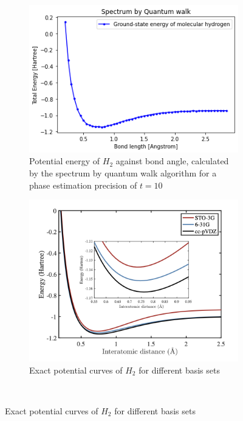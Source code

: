 \begin{figure}
    \centering
    \begin{subfigure}[b]{0.48\textwidth}
        \includegraphics[width= \textwidth]{h2_10.png}
        \caption{Potential energy of $H_2$ against bond angle, calculated by the spectrum by quantum walk algorithm for a phase estimation precision of $t= 10$}
        \label{fig:mouse}
    \end{subfigure}

    \begin{subfigure}[b]{0.48\textwidth}
        \includegraphics[width= \textwidth]{h2curv.png}
        \caption{Exact potential curves of $H_2$ for different basis sets \cite[p.~42]{McArdle}}
        \label{fig:tiger}
    \end{subfigure}
    ~ %
\end{figure}

